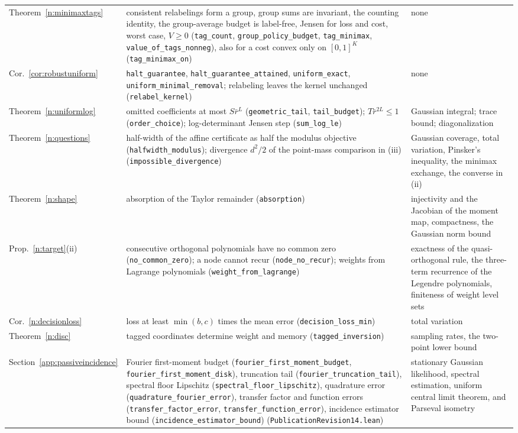 \documentclass[12pt]{article}
\theoremstyle{definition}
\theoremstyle{remark}
\begin{document}
\begin{table}[ht]
\begin{tabular}{>{\raggedright\arraybackslash}p{}>{\raggedright\arraybackslash}p{}>{\raggedright\arraybackslash}p{}}
Theorem~\ref{n:minimaxtags} & consistent relabelings form a group, group sums are invariant, the counting identity, the group-average budget is label-free, Jensen for loss and cost, worst case, $V\ge0$ (\texttt{tag\_count}, \texttt{group\_policy\_budget}, \texttt{tag\_minimax}, \texttt{value\_of\_tags\_nonneg}), also for a cost convex only on $[0,1]^K$ (\nolinkurl{tag_minimax_on}) & none\\
Cor.~\ref{cor:robustuniform} & \texttt{halt\_guarantee}, \texttt{halt\_guarantee\_attained}, \texttt{uniform\_exact}, \texttt{uniform\_minimal\_removal}; relabeling leaves the kernel unchanged (\texttt{relabel\_kernel}) & none\\
Theorem~\ref{n:uniformlog} & omitted coefficients at most $S\bar r^{L}$ (\texttt{geometric\_tail}, \texttt{tail\_budget}); $T\bar r^{2L}\le1$ (\texttt{order\_choice}); log-determinant Jensen step (\texttt{sum\_log\_le}) & Gaussian integral; trace bound; diagonalization\\Theorem~\ref{n:questions} & half-width of the affine certificate as half the modulus objective (\nolinkurl{halfwidth_modulus}); divergence $d^2/2$ of the point-mass comparison in (iii) (\nolinkurl{impossible_divergence}) & Gaussian coverage, total variation, Pinsker's inequality, the minimax exchange, the converse in (ii)\\
Theorem~\ref{n:shape} & absorption of the Taylor remainder (\nolinkurl{absorption}) & injectivity and the Jacobian of the moment map, compactness, the Gaussian norm bound\\
Prop.~\ref{n:target}(ii) & consecutive orthogonal polynomials have no common zero (\nolinkurl{no_common_zero}); a node cannot recur (\nolinkurl{node_no_recur}); weights from Lagrange polynomials (\nolinkurl{weight_from_lagrange}) & exactness of the quasi-orthogonal rule, the three-term recurrence of the Legendre polynomials, finiteness of weight level sets\\
Cor.~\ref{n:decisionloss} & loss at least $\min(b,c)$ times the mean error (\nolinkurl{decision_loss_min}) & total variation\\
Theorem~\ref{n:disc} & tagged coordinates determine weight and memory (\nolinkurl{tagged_inversion}) & sampling rates, the two-point lower bound\\
Section~\ref{app:passiveincidence} & Fourier first-moment budget (\texttt{fourier\_first\_moment\_budget}, \texttt{fourier\_first\_moment\_disk}), truncation tail (\texttt{fourier\_truncation\_tail}), spectral floor Lipschitz (\texttt{spectral\_floor\_lipschitz}), quadrature error (\texttt{quadrature\_fourier\_error}), transfer factor and function errors (\texttt{transfer\_factor\_error}, \texttt{transfer\_function\_error}), incidence estimator bound (\texttt{incidence\_estimator\_bound}) (\nolinkurl{PublicationRevision14.lean}) & stationary Gaussian likelihood, spectral estimation, uniform central limit theorem, and Parseval isometry\\

\end{tabular}
\end{table}
\end{document}

